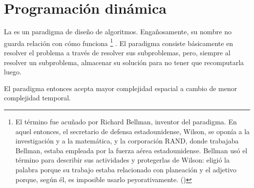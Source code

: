 \section{Programación dinámica}

La  es un paradigma de diseño de algoritmos. Engañosamente, su nombre no guarda relación con cómo funciona%
%
\footnote{
El término  fue acuñado por Richard Bellman, inventor del paradigma. En aquel entonces, el secretario de defensa estadounidense, Wilson, se oponía a la investigación y a la matemática, y la corporación RAND, donde trabajaba Bellman, estaba empleada por la fuerza aérea estadounidense. Bellman usó el término para describir sus actividades y protegerlas de Wilson: eligió la palabra  porque su trabajo estaba relacionado con planeación y el adjetivo  porque, según él, es imposible usarlo peyorativamente. (\cite{bellman_autobiography})
}%
. El paradigma consiste básicamente en resolver el problema a través de resolver sus subproblemas, pero, siempre al resolver un subproblema, almacenar su solución para no tener que recomputarla luego.

El paradigma entonces acepta mayor complejidad espacial a cambio de menor complejidad temporal.

